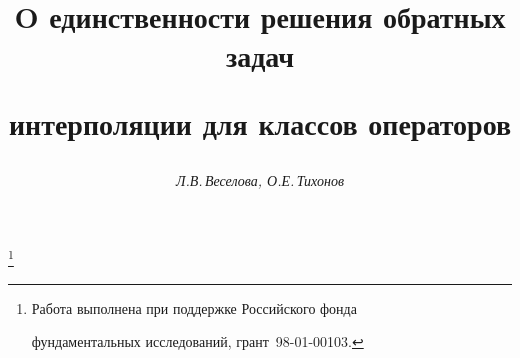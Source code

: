









\newcommand{\Int}{\operatorname{Int}}


\newcommand{\tts}[1]{}







\setcounter{page}{62}















\author{\it Л.В.\,Веселова, О.Е.\,Тихонов}




\title{O единственности решения обратных задач


интерполяции для классов операторов}


\thanks{Работа выполнена при поддержке Российского фонда


фундаментальных исследований, грант \No\,98-01-00103.}





\date{}




\pagestyle{plain} %







